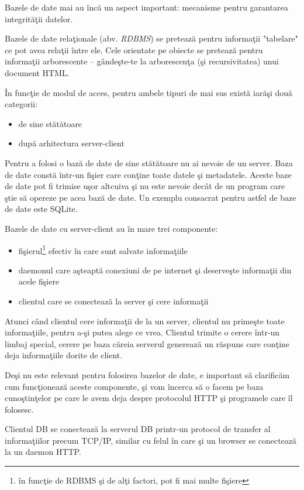Bazele de date mai au încă un aspect important: mecanisme
pentru garantarea integrităţii datelor.

Bazele de date relaţionale (abv. \textsl{RDBMS}) se pretează pentru informaţii "tabelare"
ce pot avea relaţii între ele. Cele orientate pe obiecte se pretează
pentru informaţii arborescente -- gândeşte-te la arborescenţa
(şi recursivitatea) unui document HTML.

În funcţie de modul de acces, pentru ambele tipuri de mai sus există
iarăşi două categorii:
\begin{itemize}
\item de sine stătătoare
\item după arhitectura server-client
\end{itemize}

Pentru a folosi o bază de date de sine stătătoare nu ai nevoie de un
server. Baza de date constă într-un fişier care conţine toate datele
şi metadatele. Aceste baze de date pot fi trimise uşor altcuiva
şi nu este nevoie decât de un program care ştie să opereze pe acea
bază de date. Un exemplu consacrat pentru astfel de baze de date
este SQLite.

Bazele de date cu server-client au în mare trei componente:
\begin{itemize}
\item fişierul\footnote{în funcţie de RDBMS şi de alţi
factori, pot fi mai multe fişiere} efectiv în care sunt salvate
informaţiile
\item daemonul care aşteaptă conexiuni de pe internet şi
deserveşte informaţii din acele fişiere
\item clientul care se conectează la server şi cere informaţii
\end{itemize}

Atunci când clientul cere informaţii de la un server, clientul
nu primeşte toate informaţiile, pentru a-şi putea alege ce vrea.
Clientul trimite o cerere într-un limbaj special, cerere pe baza
căreia serverul generează un răspuns care conţine deja informaţiile
dorite de client.

Deşi nu este relevant pentru folosirea bazelor de date, e important
să clarificăm cum funcţionează aceste componente, şi vom încerca
să o facem pe baza cunoştinţelor pe care le avem deja despre
protocolul HTTP şi programele care îl folosesc.

Clientul DB se conectează la serverul DB printr-un protocol
de transfer al informaţiilor precum TCP/IP, similar cu
felul în care şi un browser se conectează la un daemon HTTP.

